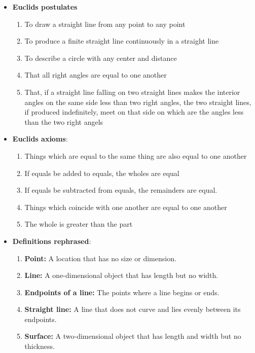 \documentclass{report}
\begin{document}
\begin{itemize}
\begin{enumerate}
            \end{enumerate}
        \item \textbf{Euclids postulates}
            \begin{enumerate}
                \item To draw a straight line from any point to any point
                \item To produce a finite straight line continuously in a straight line
                \item To describe a circle with any center and distance
                \item That all right angles are equal to one another
                \item That, if a straight line falling on two straight lines makes the interior angles on the same side less than two right angles, the two straight lines, if produced indefinitely, meet on that side on which are the angles less than the two right angels
            \end{enumerate}
        \item \textbf{Euclids axioms}:
            \begin{enumerate}
                \item Things which are equal to the same thing are also equal to one another
                \item If equals be added to equals, the wholes are equal
                \item If equals be subtracted from equals, the remainders are equal.
                \item Things which coincide with one another are equal to one another
                \item The whole is greater than the part
            \end{enumerate}
        \item \textbf{Definitions rephrased}:
            \begin{enumerate}
                \item \textbf{Point:} A location that has no size or dimension.
                \item \textbf{Line:} A one-dimensional object that has length but no width.
                \item \textbf{Endpoints of a line:} The points where a line begins or ends.
                \item \textbf{Straight line:} A line that does not curve and lies evenly between its endpoints.
                \item \textbf{Surface:} A two-dimensional object that has length and width but no thickness.

\end{enumerate}
\end{itemize}
\end{document}
